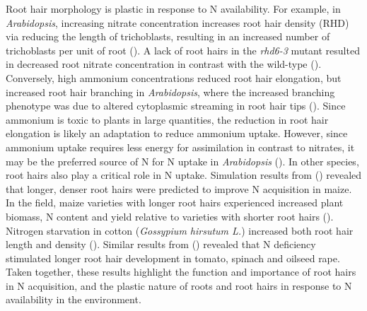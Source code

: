 \documentclass{article}
\begin{document}
Root hair morphology is plastic in response to N availability. For example, in
\textit{Arabidopsis}, increasing nitrate concentration increases root hair density
(RHD) via reducing the length of trichoblasts, resulting in an increased
number of trichoblasts per unit of root (\cite{canales_nitrate_2017}). A lack
of root hairs in the \textit{rhd6-3} mutant resulted in decreased root
nitrate concentration in contrast with the wild-type (\cite{canales_nitrate_2017}).
Conversely, high ammonium concentrations reduced root hair elongation, but increased
root hair branching in \textit{Arabidopsis}, where the increased branching phenotype
was due to altered cytoplasmic streaming in root hair tips (\cite{yang_ammonium-stimulated_2011}).
Since ammonium is toxic to plants in large quantities, the reduction in root
hair elongation is likely an adaptation to reduce ammonium uptake. However, since
ammonium uptake requires less energy for assimilation in contrast to nitrates,
it may be the preferred source of N for N uptake in \textit{Arabidopsis} (\cite{ludewig_uniport_2002}).
In other species, root hairs also play a critical role in N uptake.
Simulation results from (\cite{saengwilai_root_2021}) revealed that longer, denser
root hairs were predicted to improve N acquisition in maize. In the field, maize
varieties with longer root hairs experienced increased plant biomass, N
content and yield relative to varieties with shorter root hairs (\cite{saengwilai_root_2021}).
Nitrogen starvation in cotton (\textit{Gossypium hirsutum L.}) increased
both root hair length and density (\cite{zhu_responses_2022}). Similar results
from (\cite{foehse_influence_1983}) revealed that N deficiency stimulated longer
root hair development in tomato, spinach and oilseed rape. Taken together,
these results highlight the function and importance of root hairs in N
acquisition, and the plastic nature of roots and root hairs in response to N
availability in the environment.
\end{document}
